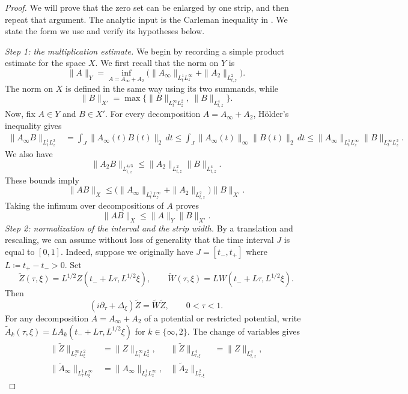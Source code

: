 \documentclass[11pt]{amsart}
\theoremstyle{remark}
\newcommand{\1}{\mathbf 1}
\begin{document}
\begin{proof}
We will prove that the zero set can be enlarged by one strip, and then
repeat that argument.  The analytic input is the Carleman inequality in
\cite[Lemma~9.1]{IonescuKenig}.  We state the form we use and verify its
hypotheses below.

\medskip
\noindent\emph{Step 1: the multiplication estimate.}
We begin by recording a simple product estimate for the space $X$. We first recall that the  norm on $Y$ is
\[
 \|A\|_Y=\inf_{A=A_\infty+A_2}
 \bigl(\|A_\infty\|_{L^1_tL^\infty_z}
       +\|A_2\|_{L^2_{t,z}}\bigr).
\]
The norm on $X$ is defined in the same way using its two summands, while
\[
 \|B\|_{X'}=\max\bigl\{
 \|B\|_{L^\infty_tL^2_z},\ \|B\|_{L^4_{t,z}}\bigr\}.
\]
Now, fix $A\in Y$ and $B\in X'$.  For every decomposition
$A=A_\infty+A_2$, H\"older's inequality gives
\begin{equation*}
\begin{split}
 \|A_\infty B\|_{L^1_tL^2_z}&=\int_J\|A_\infty(t)B(t)\|_2\,dt\leq\int_J\|A_\infty(t)\|_\infty\|B(t)\|_2\,dt\leq\|A_\infty\|_{L^1_tL^\infty_z}
       \|B\|_{L^\infty_tL^2_z}.
\end{split}
\end{equation*}
We also have
\[
 \|A_2B\|_{L^{4/3}_{t,z}}
 \le\|A_2\|_{L^2_{t,z}}\|B\|_{L^4_{t,z}}.
\]
These
bounds imply
\[
 \|AB\|_X\le
 \bigl(\|A_\infty\|_{L^1_tL^\infty_z}
       +\|A_2\|_{L^2_{t,z}}\bigr)\|B\|_{X'}.
\]
Taking the infimum over decompositions of $A$ proves
\[
 \|AB\|_X\le\|A\|_Y\|B\|_{X'}.
 \tag{1.4}\label{eq:XY-multiplier}
\]
\noindent\emph{Step 2: normalization of the interval and the strip width.} By a translation and rescaling, we can assume without loss of generality that the time interval $J$ is equal to $[0,1]$. Indeed, suppose we originally have $J=[t_-,t_+]$ where $L\coloneq t_+-t_->0$. Set
\[
 \widetilde Z(\tau,\xi)=L^{1/2}Z(t_-+L\tau,L^{1/2}\xi),
 \qquad
 \widetilde W(\tau,\xi)=L W(t_-+L\tau,L^{1/2}\xi).
\]
Then
\[
 (i\partial_\tau+\Delta_\xi)\widetilde Z
 =\widetilde W\widetilde Z,
 \qquad 0<\tau<1.
\]
For any decomposition $A=A_\infty+A_2$ of a potential or restricted
potential, write
$\widetilde A_k(\tau,\xi)=L A_k(t_-+L\tau,L^{1/2}\xi)$ for
$k\in\{\infty,2\}$.  The change of variables gives
\begin{align*}
 \|\widetilde Z\|_{L^\infty_\tau L^2_\xi}
 &=\|Z\|_{L^\infty_tL^2_z},
 &\|\widetilde Z\|_{L^4_{\tau,\xi}}
 &=\|Z\|_{L^4_{t,z}},\\
 \|\widetilde A_\infty\|_{L^1_\tau L^\infty_\xi}
 &=\|A_\infty\|_{L^1_tL^\infty_z},
 &\|\widetilde A_2\|_{L^2_{\tau,\xi}}

\end{align*}
\end{proof}
\end{document}
